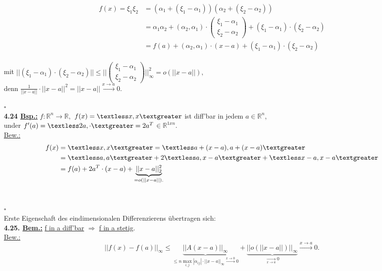 \documentclass[]{scrartcl}
\begin{document}
\begin{align}
	f(x)=\xi_1\xi_2&=(\alpha_1+(\xi_1-\alpha_1))(\alpha_2+(\xi_2-\alpha_2))\\
	&=\alpha_1\alpha_2+(\alpha_2,\alpha_1)\cdot\begin{pmatrix}
		\xi_1-\alpha_1\\\xi_2-\alpha_2
	\end{pmatrix}+(\xi_1-\alpha_1)\cdot(\xi_2-\alpha_2)\\
	&=f(a)+(\alpha_2,\alpha_1)\cdot(x-a)+(\xi_1-\alpha_1)\cdot(\xi_2-\alpha_2)
\end{align}\\
mit $||(\xi_1-\alpha_1)\cdot(\xi_2-\alpha_2)||\leq||\begin{pmatrix}
	\xi_1-\alpha_1\\\xi_2-\alpha_2
\end{pmatrix}||_\infty^2=o(||x-a||),$\\
denn $\frac{1}{||x-a||}\cdot||x-a||^2=||x-a||\xrightarrow{x\rightarrow a}0.$\\
\strut\hfill$\square$\\
\textbf{4.24 \underline{Bsp.:}} $f:\mathbb{R}^n\rightarrow\mathbb{R},$ 
\ul{$f(x)=\textless x,x\textgreater$} ist diff'bar in jedem 
$a\in\mathbb{R}^n$,\\
under \ul{$f'(a)=\textless 2a,\cdot\textgreater=2a^T$}$\in\mathbb{R}^{1xn}.$\\
\underline{Bew.:}
\begin{align}
	f(x)&=\textless x,x\textgreater=\textless a+(x-a), a+(x-a)\textgreater\\
	&=\textless a,a\textgreater+2\textless a,x-a\textgreater+\textless 
	x-a,x-a\textgreater\\
	&=f(a)+2a^T\cdot(x-a)+\underbrace{||x-a||_2^2}_{=o(||x-a||).}
\end{align}\\
\strut\hfill$\square$\\
Erste Eigenschaft des eindimensionalen Differenzierens übertragen sich:\\
\textbf{4.25. \underline{Bem.:}} \ul{f in a diff'bar} $\Rightarrow$ \ul{f in a 
stetig}.\\
\underline{Bew.:}
\begin{equation}
	||f(x)-f(a)||_\infty\leq \underbrace{||A(x-a)||_\infty}_{\leq n 
	\max_{i,j}|\alpha_{ij}|\cdot||x-a||_\infty\xrightarrow{x\rightarrow 
	0}0}+\underbrace{||o(||x-a||)||_\infty}_{\xrightarrow[x\rightarrow a]{ 
	}0}\xrightarrow{x\rightarrow a}0.
\end{equation}\\
\end{document}
